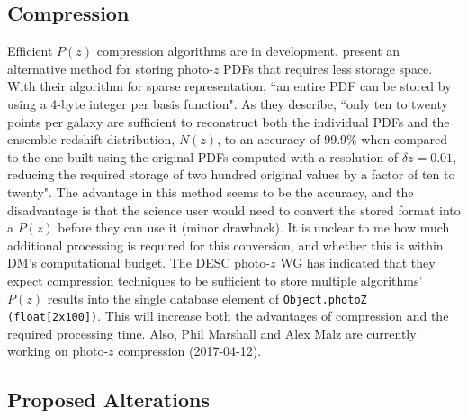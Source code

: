 \documentclass[DM,lsstdraft,toc]{lsstdoc}
\begin{document}
\subsection{Compression}\label{ssec:format_compression}

Efficient $P(z)$ compression algorithms are in development. \cite{2014MNRAS.441.3550C} present an alternative method for storing photo-$z$ PDFs that requires less storage space. With their algorithm for sparse representation, ``an entire PDF can be stored by using a 4-byte integer per basis function". As they describe, ``only ten to twenty points per galaxy are sufficient to reconstruct both the individual PDFs and the ensemble redshift distribution, $N(z)$, to an accuracy of 99.9\% when compared to the one built using the original PDFs computed with a resolution of $\delta z = 0.01$, reducing the required storage of two hundred original values by a factor of ten to twenty". The advantage in this method seems to be the accuracy, and the disadvantage is that the science user would need to convert the stored format into a $P(z)$ before they can use it (minor drawback). It is unclear to me how much additional processing is required for this conversion, and whether this is within DM's computational budget. The DESC photo-$z$ WG has indicated that they expect compression techniques to be sufficient to store multiple algorithms' $P(z)$ results into the single database element of \texttt{Object.photoZ (float[2x100])}. This will increase both the advantages of compression and the required processing time. Also, Phil Marshall and Alex Malz are currently working on photo-$z$ compression (2017-04-12).

\subsection{Proposed Alterations}\label{ssec:format_summary}
\end{document}
